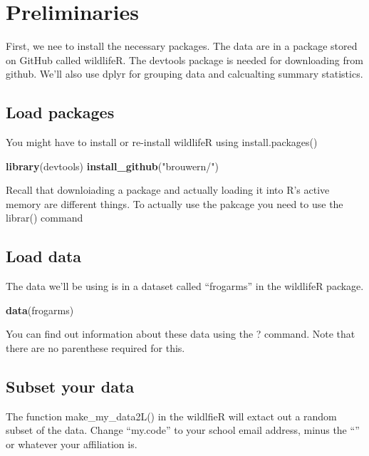 \documentclass[]{book}
\newenvironment{Shaded}{\begin{snugshade}}{\end{snugshade}}
\newcommand{\KeywordTok}[1]{\textcolor[rgb]{0.13,0.29,0.53}{\textbf{#1}}}
\newcommand{\StringTok}[1]{\textcolor[rgb]{0.31,0.60,0.02}{#1}}
\newcommand{\NormalTok}[1]{#1}
\theoremstyle{definition}
\theoremstyle{definition}
\theoremstyle{definition}
\theoremstyle{remark}
\begin{document}
\section{Preliminaries}\label{preliminaries-1}

First, we nee to install the necessary packages. The data are in a
package stored on GitHub called wildlifeR. The devtools package is
needed for downloading from github. We'll also use dplyr for grouping
data and calcualting summary statistics.

\subsection{Load packages}\label{load-packages}

You might have to install or re-install wildlifeR using
install.packages()

\begin{Shaded}
\begin{Highlighting}[]
\KeywordTok{library}\NormalTok{(devtools)}
\KeywordTok{install_github}\NormalTok{(}\StringTok{"brouwern/"}\NormalTok{)}
\end{Highlighting}
\end{Shaded}

Recall that downloiading a package and actually loading it into R's
active memory are different things. To actually use the pakcage you need
to use the librar() command

\subsection{Load data}\label{load-data}

The data we'll be using is in a dataset called ``frogarms'' in the
wildlifeR package.

\begin{Shaded}
\begin{Highlighting}[]
\KeywordTok{data}\NormalTok{(frogarms)}
\end{Highlighting}
\end{Shaded}

You can find out information about these data using the ? command. Note
that there are no parenthese required for this.

\subsection{Subset your data}\label{subset-your-data}

The function make\_my\_data2L() in the wildlfieR will extact out a
random subset of the data. Change ``my.code'' to your school email
address, minus the ``\citet{pitt.edu}'' or whatever your affiliation is.
\end{document}
